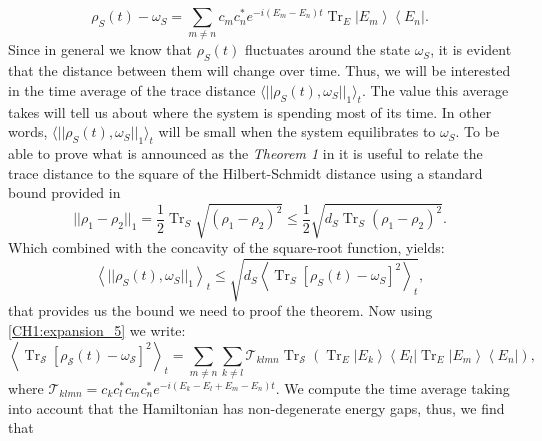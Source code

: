 \begin{equation}
\rho_{S}(t)-\omega_{S}=\sum_{m \neq n} c_{m} c_{n}^{*} e^{-i\left(E_{m}-E_{n}\right) t} \operatorname{Tr}_{E}\left|E_{m}\right\rangle\left\langle E_{n}\right|.
\label{CH1:expansion_5}
\end{equation}
Since in general we know that $\rho_S(t)$ fluctuates around the state $\omega_S$, it is evident that the distance between them will change over time. Thus, we will be interested in the time average of the trace distance $\langle ||\rho_{S}(t), \omega_{S}||_1\rangle_t$. The value this average takes will tell us about where the system is spending most of its time. In other words, $\langle ||\rho_{S}(t), \omega_{S}||_1\rangle_t$ will be small when the system equilibrates to $\omega_S$. To be able to prove what is announced as the \textit{Theorem 1} in \cite{linden_quantum_2009} it is useful to relate the trace distance to the square of the Hilbert-Schmidt distance using a standard bound provided in \cite{fuchs_cryptographic_1999}
\begin{equation}
||\rho_{1}-\rho_{2}||_1=\frac{1}{2} \operatorname{Tr}_{S} \sqrt{\left(\rho_{1}-\rho_{2}\right)^{2}} \leq \frac{1}{2} \sqrt{d_{S} \operatorname{Tr}_{S}\left(\rho_{1}-\rho_{2}\right)^{2}}.
\label{CH1:Linden_proof_1}
\end{equation}
Which combined with the concavity of the square-root function, yields:
\begin{equation}
\left\langle ||\rho_{S}(t), \omega_{S}||_1\right\rangle_{t} \leq \sqrt{d_{S}\left\langle\operatorname{Tr}_{S}\left[\rho_{S}(t)-\omega_{S}\right]^{2}\right\rangle_{t}},
\label{CH1:Linden_proof_2}
\end{equation}
that provides us the bound we need to proof the theorem. Now using \eqref{CH1:expansion_5} we write:
\begin{equation}
\left\langle\operatorname{Tr}_{\mathcal{S}}\left[\rho_{\mathcal{S}}(t)-\omega_{\mathcal{S}}\right]^{2}\right\rangle_{t}=\sum_{m \neq n} \sum_{k \neq l} \mathcal{T}_{k l m n} \operatorname{Tr}_{\mathcal{S}}\left(\operatorname{Tr}_{E}\left|E_{k}\right\rangle\left\langle E_{l}\left|\operatorname{Tr}_{E}\right| E_{m}\right\rangle\left\langle E_{n}\right|\right),
\end{equation}
where $\mathcal{T}_{k l m n}=c_{k} c_{l}^{*} c_{m} c_{n}^{*} e^{-i\left(E_{k}-E_{l}+E_{m}-E_{n}\right) t}$. We compute the time average taking into account that the Hamiltonian has non-degenerate energy gaps, thus, we find that

